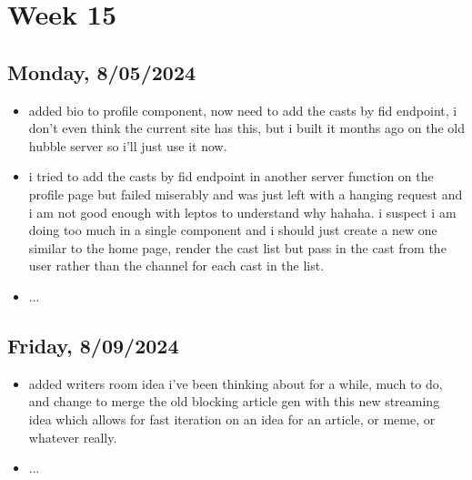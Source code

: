 \newpage
\section{Week 15}

\subsection*{Monday, 8/05/2024}
\begin{itemize}
    \item added bio to profile component, now need to add the casts by fid
        endpoint, i don't even think the current site has this, but i built it
        months ago on the old hubble server so i'll just use it now.
    \item i tried to add the casts by fid endpoint in another server function on
        the profile page but failed miserably and was just left with a hanging
        request and i am not good enough with leptos to understand why hahaha. i
        suspect i am doing too much in a single component and i should just
        create a new one similar to the home page, render the cast list but pass
        in the cast from the user rather than the channel for each cast in the
        list.
    \item ...
\end{itemize}

\subsection*{Friday, 8/09/2024}
\begin{itemize}
    \item added writers room idea i've been thinking about for a while, much to
        do, and change to merge the old blocking article gen with this new
        streaming idea which allows for fast iteration on an idea for an
        article, or meme, or whatever really.
    \item ...
\end{itemize}

